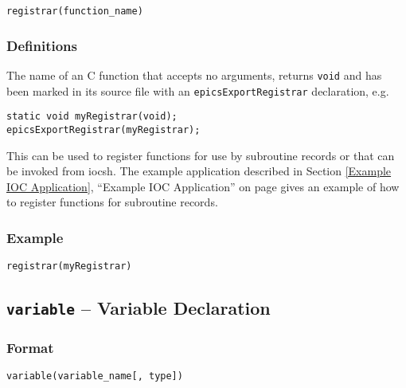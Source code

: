 \begin{lstlisting}[language=dbd]
registrar(function_name)
\end{lstlisting}

\subsubsection{Definitions}

\begin{description}
\item [function\_name] The name of an C function that accepts no arguments, returns \verb|void| and has been marked in
its source file with an \verb|epicsExportRegistrar| declaration, e.g.
\end{description}

\begin{lstlisting}[language=dbd]
static void myRegistrar(void);
epicsExportRegistrar(myRegistrar);
\end{lstlisting}

This can be used to register functions for use by subroutine records or that can be invoked from iocsh. The example 
application described in Section \ref{Example IOC Application}, ``Example IOC Application'' on page \pageref{Example IOC Application}
gives an example of how to register functions for subroutine records.

\subsubsection{Example}

\begin{lstlisting}[language=dbd]
registrar(myRegistrar)
\end{lstlisting}

\subsection{\texttt{variable} -- Variable Declaration}

\subsubsection{Format}

\begin{lstlisting}[language=dbd]
variable(variable_name[, type])
\end{lstlisting}

